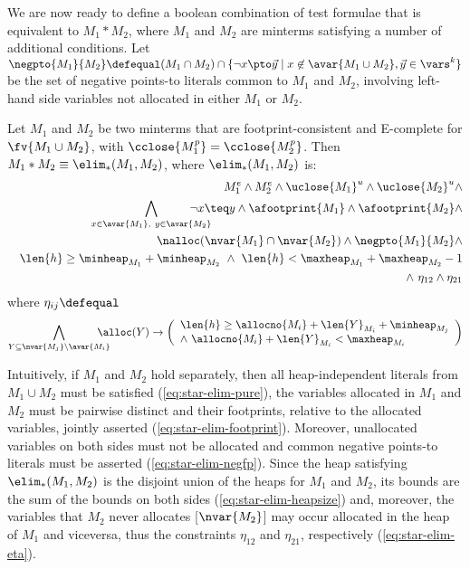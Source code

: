 We are now ready to define a boolean combination of test formulae that
is equivalent to $M_1 * M_2$, where $M_1$ and $M_2$ are minterms
satisfying a number of additional conditions. Let \(\negpto{M_1}{M_2}
\defequal (M_1 \cap M_2) \cap \{\neg x \pto \vec{y} \mid x \not\in
\avar{M_1 \cup M_2}, \vec{y} \in \vars^k\}\) be the set of negative
points-to literals common to $M_1$ and $M_2$, involving left-hand side
variables not allocated in either $M_1$ or $M_2$.

\begin{lemma}\label{lemma:star-elim}
  Let $M_1$ and $M_2$ be two minterms that are footprint-consistent
  and E-complete for $\fv{M_1 \cup M_2}$, with $\cclose{M_1^p}
  = \cclose{M_2^p}$. Then $M_1 * M_2 \equiv \elim_*(M_1,M_2)$, where
  $\elim_*(M_1,M_2)$ is:
  \begin{eqnarray}
    && %
    M_1^e \wedge M_2^e \wedge \uclose{M_1}^u \wedge \uclose{M_2}^u \wedge \label{eq:star-elim-pure} \\
    && \bigwedge_{
        \scriptstyle{x \in \avar{M_1}},~ 
        \scriptstyle{y \in \avar{M_2}}
    } \!\!\!\!\!\!\!\!\!\!\!\!\neg x \teq y \wedge \afootprint{M_1} \wedge \afootprint{M_2} \wedge 
    \label{eq:star-elim-footprint} \\
    && \nalloc(\nvar{M_1} \cap \nvar{M_2}) \wedge \negpto{M_1}{M_2}
    \wedge \label{eq:star-elim-negfp} \\
    && \len{h} \geq \minheap_{M_1} + \minheap_{M_2} ~\wedge~ \len{h} < \maxheap_{M_1} + \maxheap_{M_2} - 1 \label{eq:star-elim-heapsize} \\
    && \wedge~ \eta_{12} \wedge \eta_{21} \label{eq:star-elim-eta}
  \end{eqnarray}
  where $\eta_{ij} \defequal$ \[\bigwedge_{Y \subseteq \nvar{M_j} \setminus \avar{M_i}} 
  \!\!\!\!\!\!\!\! \alloc(Y) \rightarrow 
    \left(\begin{array}{l} \len{h} \geq \allocno{M_i} + \len{Y}_{M_i} + \minheap_{M_j} \\
    \wedge~ \allocno{M_i} + \len{Y}_{M_i} < \maxheap_{M_i}\end{array}\right)\]
\end{lemma}
Intuitively, if $M_1$ and $M_2$ hold separately, then all
heap-indepen\-dent literals from $M_1 \cup M_2$ must be satisfied
(\ref{eq:star-elim-pure}), the variables allocated in $M_1$ and $M_2$
must be pairwise distinct and their footprints, relative to the
allocated variables, jointly asserted
(\ref{eq:star-elim-footprint}). Moreover, unallocated variables on
both sides must not be allocated and common negative points-to
literals must be asserted (\ref{eq:star-elim-negfp}). Since the heap
satisfying $\elim_*(M_1,M_2)$ is the disjoint union of the heaps for
$M_1$ and $M_2$, its bounds are the sum of the bounds on both sides
(\ref{eq:star-elim-heapsize}) and, moreover, the variables that $M_2$
never allocates [$\nvar{M_2}$] may occur allocated in the heap of
$M_1$ and viceversa, thus the constraints $\eta_{12}$ and $\eta_{21}$,
respectively (\ref{eq:star-elim-eta}).

